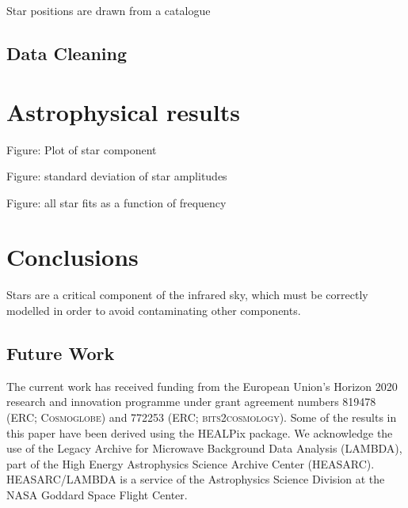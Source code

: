 \documentclass{aa}
\begin{document}
Star positions are drawn from a catalogue 

\subsection{Data Cleaning}

\clearpage
\section{Astrophysical results}
\label{sec:results}

Figure: Plot of star component

Figure: standard deviation of star amplitudes

Figure: all star fits as a function of frequency 

\clearpage
\section{Conclusions}
\label{sec:conclusions}

Stars are a critical component of the infrared sky, which must be correctly modelled in order to avoid contaminating other components. 

\subsection{Future Work}






\begin{acknowledgements}
 The current work has received funding from the European
  Union’s Horizon 2020 research and innovation programme under grant
  agreement numbers 819478 (ERC; \textsc{Cosmoglobe}) and 772253 (ERC;
  \textsc{bits2cosmology}). Some of the results in this paper have been derived using the HEALPix \citep{HEALPIX} package.
  We acknowledge the use of the Legacy Archive for Microwave Background Data
  Analysis (LAMBDA), part of the High Energy Astrophysics Science Archive Center
  (HEASARC). HEASARC/LAMBDA is a service of the Astrophysics Science Division at
  the NASA Goddard Space Flight Center.  
\end{acknowledgements}


%



\end{document}
